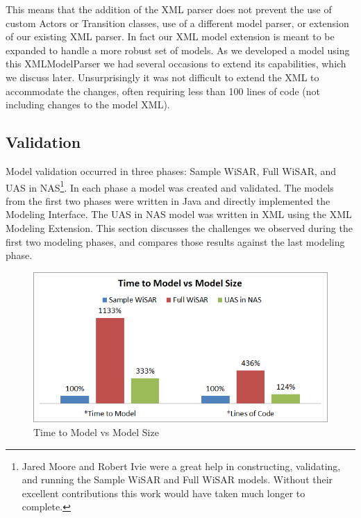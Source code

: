 This means that the addition of the XML parser does not prevent the use of custom Actors or Transition classes, use of a different model parser, or extension of our existing XML parser.  In fact our XML model extension is meant to be expanded to handle a more robust set of models.   As we developed a model using this XMLModelParser we had several occasions to extend its capabilities, which we discuss later.  Unsurprisingly it was not difficult to extend the XML to accommodate the changes, often requiring less than 100 lines of code (not including changes to the model XML).

\subsection{Validation}

Model validation occurred in three phases: Sample WiSAR, Full WiSAR, and UAS in NAS\footnote{Jared Moore and Robert Ivie were a great help in constructing, validating, and running the Sample WiSAR and Full WiSAR models.  Without their excellent contributions this work would have taken much longer to complete.}.  In each phase a model was created and validated.  The models from the first two phases were written in Java and directly implemented the Modeling Interface.  The UAS in NAS model was written in XML using the XML Modeling Extension.  This section discusses the challenges we observed during the first two modeling phases, and compares those results against the last modeling phase.

\begin{figure}[h]
\begin{center}
\includegraphics[width=5in]{time_to_model.png}
\caption{Time to Model vs Model Size}
\label{fig:time_to_model}
\end{center}
\end{figure}

